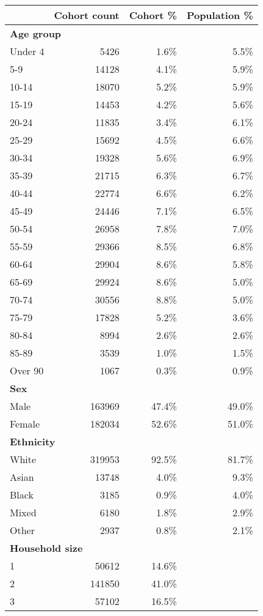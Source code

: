 \begin{tabular}{lrrr}
\hline
& Cohort count & Cohort \% & Population \% \\
\hline
\multicolumn{4}{l}{\textbf{Age group}} \\
Under 4 & 5426 & 1.6\% & 5.5\% \\
5-9 & 14128 & 4.1\% & 5.9\% \\
10-14 & 18070 & 5.2\% & 5.9\% \\
15-19 & 14453 & 4.2\% & 5.6\% \\
20-24 & 11835 & 3.4\% & 6.1\% \\
25-29 & 15692 & 4.5\% & 6.6\% \\
30-34 & 19328 & 5.6\% & 6.9\% \\
35-39 & 21715 & 6.3\% & 6.7\% \\
40-44 & 22774 & 6.6\% & 6.2\% \\
45-49 & 24446 & 7.1\% & 6.5\% \\
50-54 & 26958 & 7.8\% & 7.0\% \\
55-59 & 29366 & 8.5\% & 6.8\% \\
60-64 & 29904 & 8.6\% & 5.8\% \\
65-69 & 29924 & 8.6\% & 5.0\% \\
70-74 & 30556 & 8.8\% & 5.0\% \\
75-79 & 17828 & 5.2\% & 3.6\% \\
80-84 & 8994 & 2.6\% & 2.6\% \\
85-89 & 3539 & 1.0\% & 1.5\% \\
Over 90 & 1067 & 0.3\% & 0.9\% \\
\hline
\multicolumn{4}{l}{\textbf{Sex}} \\
Male & 163969 & 47.4\% & 49.0\% \\
Female & 182034 & 52.6\% & 51.0\% \\
\hline
\multicolumn{4}{l}{\textbf{Ethnicity}} \\
White & 319953 & 92.5\% & 81.7\% \\
Asian & 13748 & 4.0\% & 9.3\% \\
Black & 3185 & 0.9\% & 4.0\% \\
Mixed & 6180 & 1.8\% & 2.9\% \\
Other & 2937 & 0.8\% & 2.1\% \\
\hline
\multicolumn{4}{l}{\textbf{Household size}} \\
1 & 50612 & 14.6\% &  \\
2 & 141850 & 41.0\% &  \\
3 & 57102 & 16.5\% &  \\

\end{tabular}
